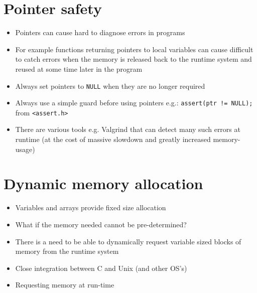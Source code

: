 \documentclass{article}
\begin{document}
\section{Pointer safety}
\begin{itemize}
\item Pointers can cause hard to diagnose errors in programs

\item For example functions returning pointers to local variables can cause difficult to catch errors when the memory is released back to the runtime system and reused at some time later in the program

\item Always set pointers to \verb!NULL! when they are no longer required

\item Always use a simple guard before using pointers e.g.:
\verb~assert(ptr != NULL);~ from \verb!<assert.h>!

\item There are various tools e.g. Valgrind that can detect many such errors at runtime (at the cost of massive slowdown and greatly increased memory-usage)
\end{itemize}



\section{Dynamic memory allocation}
\begin{itemize}
\item Variables and arrays provide fixed size allocation
\item What if the memory needed cannot be pre-determined?
\item There is a need to be able to dynamically request variable sized blocks of memory from the runtime system
\item Close integration between C and Unix (and other OS's)
\item Requesting memory at run-time
\end{itemize}
\end{document}
